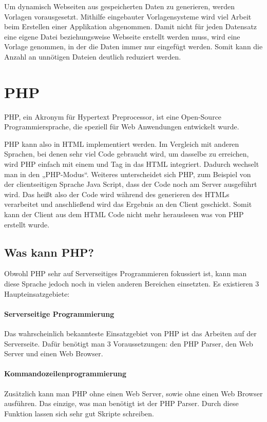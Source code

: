Um dynamisch Webseiten aus gespeicherten Daten zu generieren, werden Vorlagen vorausgesetzt. Mithilfe eingebauter Vorlagensysteme wird viel Arbeit beim Erstellen einer Applikation abgenommen. Damit nicht für jeden Datensatz eine eigene Datei beziehungsweise Webseite erstellt werden muss, wird eine Vorlage genommen, in der die Daten immer nur eingefügt werden. Somit kann die Anzahl an unnötigen Dateien deutlich reduziert werden.

\section{PHP}

PHP\cite{WhatisPHP}, ein Akronym für Hypertext Preprocessor, ist eine Open-Source Programmiersprache, die speziell für Web Anwendungen entwickelt wurde. 

PHP kann also in HTML implementiert werden. Im Vergleich mit anderen Sprachen, bei denen sehr viel Code gebraucht wird, um dasselbe zu erreichen, wird PHP einfach mit einem  und  Tag in das HTML integriert. Dadurch wechselt man in den „PHP-Modus“. 
Weiteres unterscheidet sich PHP, zum Beispiel von der clientseitigen Sprache Java Script, dass der Code noch am Server ausgeführt wird. Das heißt also der Code wird während des generieren des HTMLs verarbeitet und anschließend wird das Ergebnis an den Client geschickt. Somit kann der Client aus dem HTML Code nicht mehr herauslesen was von PHP erstellt wurde.

\subsection{Was kann PHP?}

Obwohl PHP\cite{WhatPHPcanDo} sehr auf Serverseitiges Programmieren fokussiert ist, kann man diese Sprache jedoch noch in vielen anderen Bereichen einsetzten. Es existieren 3 Haupteinsatzgebiete:

\paragraph{Serverseitige Programmierung} Das wahrscheinlich bekannteste Einsatzgebiet von PHP ist das Arbeiten auf der Serverseite. Dafür benötigt man 3 Voraussetzungen: den PHP Parser, den Web Server und einen Web Browser. 

\paragraph{Kommandozeilenprogrammierung} Zusätzlich kann man PHP ohne einen Web Server, sowie ohne einen Web Browser ausführen. Das einzige, was man benötigt ist der PHP Parser. Durch diese Funktion lassen sich sehr gut Skripte schreiben.

